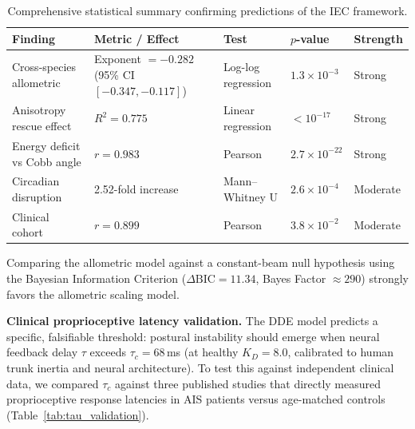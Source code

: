 \documentclass[11pt]{article}
\begin{document}
\begin{table}[h]
\centering
\caption{Comprehensive statistical summary confirming predictions of the IEC framework.}
\label{tab:comprehensive_stats}
\small
\begin{tabular}{p{3.5cm} p{3.2cm} p{2.8cm} p{1.5cm} p{1.5cm}}
\toprule
\textbf{Finding} & \textbf{Metric / Effect} & \textbf{Test} & \textbf{$p$-value} & \textbf{Strength} \\
\midrule
Cross-species allometric & Exponent $= -0.282$ (95\% CI $[-0.347, -0.117]$) & Log-log regression & $1.3\times10^{-3}$ & Strong \\
Anisotropy rescue effect & $R^2 = 0.775$ & Linear regression & $<10^{-17}$ & Strong \\
Energy deficit vs Cobb angle & $r = 0.983$ & Pearson & $2.7\times10^{-22}$ & Strong \\
Circadian disruption & 2.52-fold increase & Mann--Whitney U & $2.6\times10^{-4}$ & Moderate \\
Clinical cohort & $r = 0.899$ & Pearson & $3.8\times10^{-2}$ & Moderate \\
\bottomrule
\end{tabular}
\end{table}

Comparing the allometric model against a constant-beam null hypothesis using the Bayesian Information Criterion ($\Delta\mathrm{BIC} = 11.34$, Bayes Factor $\approx 290$) strongly favors the allometric scaling model.

\textbf{Clinical proprioceptive latency validation.} The DDE model predicts a specific, falsifiable threshold: postural instability should emerge when neural feedback delay $\tau$ exceeds $\tau_c = 68$\,ms (at healthy $K_D = 8.0$, calibrated to human trunk inertia and neural architecture). To test this against independent clinical data, we compared $\tau_c$ against three published studies that directly measured proprioceptive response latencies in AIS patients versus age-matched controls (Table~\ref{tab:tau_validation}).
\end{document}
